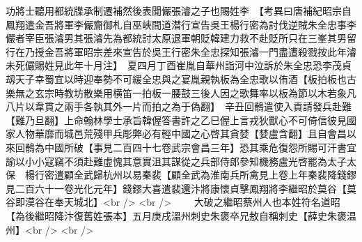 功將士聽用都統牒承制遷補然後表聞儼張濬之子也賜姓李　【考異曰唐補紀昭宗自鳳翔遣金吾將軍李儼齎御札自巫峽間道潜行宣告吳王楊行密為討伐逆賊朱全忠事李儼者宰臣張濬男其張濬先為都統討太原退軍朝貶韓建力救不赴貶所只在三峯其男留行在乃授金吾將軍昭宗差來宣告於吳王行密朱全忠探知張濬一門盡遭殺戮按此年濬未死儼賜姓見此年十月注】　夏四月丁酉崔胤自華州詣河中泣訴於朱全忠恐李茂貞刼天子幸蜀宜以時迎奉勢不可緩全忠與之宴胤親執板為全忠歌以侑酒【板拍板也古樂無之玄宗時教坊散樂用横笛一拍板一腰鼓三後人因之歌舞率以板為節以木若象凡八片以韋貫之兩手各執其外一片而拍之為于偽翻】　辛丑回鶻遣使入貢請發兵赴難【難乃旦翻】上命翰林學士承旨韓偓答書許之乙巳偓上言戎狄獸心不可倚信彼見國家人物華靡而城邑荒殘甲兵彫弊必有輕中國之心啓其貪婪【婪盧含翻】且自會昌以來回鶻為中國所破【事見二百四十七卷武宗會昌三年】恐其乘危復怨所賜可汗書宜諭以小小寇竊不須赴難虛愧其意實沮其謀從之兵部侍郎參知機務盧光啓罷為太子太保　楊行密遣顧全武歸杭州以易秦裴【顧全武為淮南兵所禽見上卷上年秦裴降錢鏐見二百六十一卷光化元年】錢鏐大喜遣裴還汴將康懷貞擊鳳翔將李繼昭於莫谷【莫谷即漠谷在奉天城北】<br />
<br />
　　大破之繼昭蔡州人也本姓符名道昭【為後繼昭降汴復舊姓張本】五月庚戌溫州刺史朱褒卒兄敖自稱刺史【薛史朱褒温州】<br />
<br />
